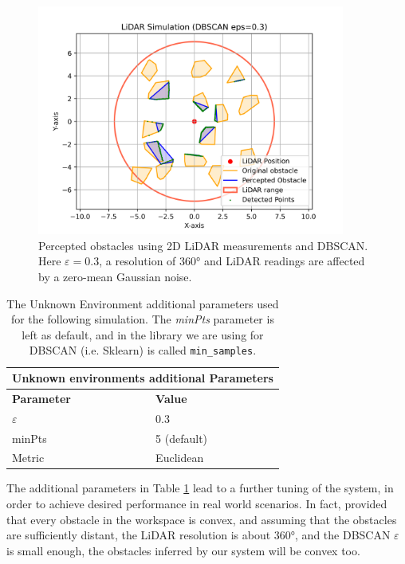 \begin{figure}[H]
    \centering
    \includegraphics[width=0.9\textwidth]{../figures/Simulations/dbscan/dbscan_and_rangefinder.png}
    \caption{Percepted obstacles using 2D LiDAR measurements and DBSCAN. Here $\varepsilon=0.3$, a resolution of 360° and LiDAR readings are affected by a zero-mean Gaussian noise.}
    \label{fig:dbscan_and_rangefinder}
\end{figure}

\begin{table}[h]
        \begin{tabular}{ |p{4cm}||p{4cm}| }
             \hline
             \multicolumn{2}{|c|}{Unknown environments additional Parameters} \\
             \hline
             \textbf{Parameter} & \textbf{Value}\\
             \hline
             $\varepsilon$ & 0.3 \\
             minPts & 5 (default) \\
             Metric & Euclidean \\
             \hline
        \end{tabular}
    \centering
    \caption{The Unknown Environment additional parameters used for the following simulation. The \textit{minPts}
        parameter is left as default, and in the library we are using for DBSCAN (i.e. Sklearn) is called \texttt{min\_samples}.}
    \label{tab:dbscan-params}
\end{table}

The additional parameters in Table \ref{tab:dbscan-params} lead to a further tuning of the system, in order to achieve desired
performance in real world scenarios. In fact, provided that every obstacle in the workspace is convex, and assuming
that the obstacles are sufficiently distant, the LiDAR resolution is about 360°, and the
DBSCAN $\varepsilon$ is small enough, the obstacles inferred by our system will
be convex too.

